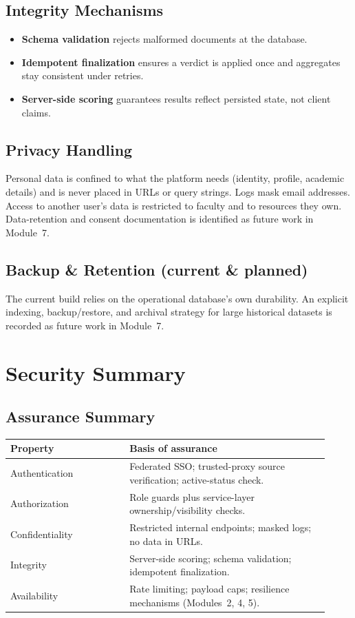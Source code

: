 \documentclass[12pt,a4paper,oneside]{report}
\begin{document}
\section{Integrity Mechanisms}
\begin{itemize}[leftmargin=1.5em]
  \item \textbf{Schema validation} rejects malformed documents at the database.
  \item \textbf{Idempotent finalization} ensures a verdict is applied once and
        aggregates stay consistent under retries.
  \item \textbf{Server-side scoring} guarantees results reflect persisted state,
        not client claims.
\end{itemize}

\section{Privacy Handling}
Personal data is confined to what the platform needs (identity, profile,
academic details) and is never placed in URLs or query strings. Logs mask email
addresses. Access to another user's data is restricted to faculty and to
resources they own. Data-retention and consent documentation is identified as
future work in Module~7.

\section{Backup \& Retention (current \& planned)}
The current build relies on the operational database's own durability. An
explicit indexing, backup/restore, and archival strategy for large historical
datasets is recorded as future work in Module~7.

\chapter{Security Summary}
\section{Assurance Summary}
\begin{longtable}{@{}p{0.34\linewidth} p{0.58\linewidth}@{}}
\toprule
\textbf{Property} & \textbf{Basis of assurance}\\
\midrule
\endhead
Authentication & Federated SSO; trusted-proxy source verification; active-status check.\\
Authorization & Role guards plus service-layer ownership/visibility checks.\\
Confidentiality & Restricted internal endpoints; masked logs; no data in URLs.\\
Integrity & Server-side scoring; schema validation; idempotent finalization.\\
Availability & Rate limiting; payload caps; resilience mechanisms (Modules~2, 4, 5).\\
\bottomrule
\end{longtable}
\end{document}
